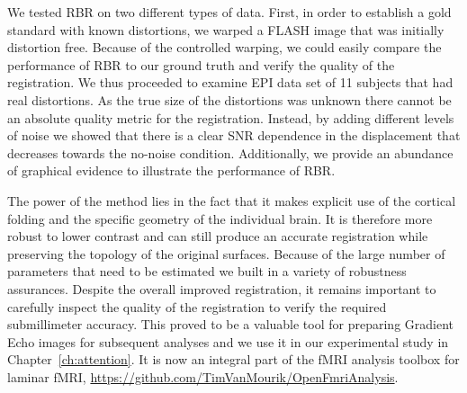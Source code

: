 We tested RBR on two different types of data. First, in order to establish a gold standard with known distortions, we warped a FLASH image that was initially distortion free. Because of the controlled warping, we could easily compare the performance of RBR to our ground truth and verify the quality of the registration. We thus proceeded to examine EPI data set of 11 subjects that had real distortions. As the true size of the distortions was unknown there cannot be an absolute quality metric for the registration. Instead, by adding different levels of noise we showed that there is a clear SNR dependence in the displacement that decreases towards the no-noise condition. Additionally, we provide an abundance of graphical evidence to illustrate the performance of RBR.

The power of the method lies in the fact that it makes explicit use of the cortical folding and the specific geometry of the individual brain. It is therefore more robust to lower contrast and can still produce an accurate registration while preserving the topology of the original surfaces. Because of the large number of parameters that need to be estimated we built in a variety of robustness assurances. Despite the overall improved registration, it remains important to carefully inspect the quality of the registration to verify the required submillimeter accuracy. This proved to be a valuable tool for preparing Gradient Echo images for subsequent analyses and we use it in our experimental study in Chapter~\ref{ch:attention}. It is now an integral part of the fMRI analysis toolbox for laminar fMRI, \url{https://github.com/TimVanMourik/OpenFmriAnalysis}.

